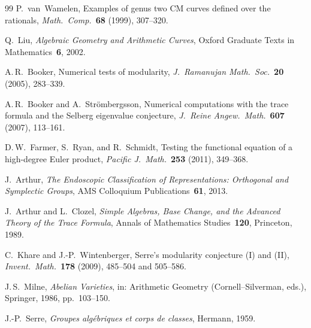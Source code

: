 \documentclass[11pt,a4paper]{article}
\theoremstyle{definition}
\theoremstyle{remark}
\begin{document}
\begin{thebibliography}{99}
P.~van~Wamelen,
Examples of genus two CM curves defined over the rationals,
\emph{Math.\ Comp.}~\textbf{68} (1999), 307--320.

Q.~Liu,
\emph{Algebraic Geometry and Arithmetic Curves},
Oxford Graduate Texts in Mathematics~\textbf{6}, 2002.

A.\,R.~Booker,
Numerical tests of modularity,
\emph{J.\ Ramanujan Math.\ Soc.}~\textbf{20} (2005), 283--339.

A.\,R.~Booker and A.~Str\"ombergsson,
Numerical computations with the trace formula and the Selberg
eigenvalue conjecture,
\emph{J.\ Reine Angew.\ Math.}~\textbf{607} (2007), 113--161.

D.\,W.~Farmer, S.~Ryan, and R.~Schmidt,
Testing the functional equation of a high-degree Euler product,
\emph{Pacific J.\ Math.}~\textbf{253} (2011), 349--368.

J.~Arthur,
\emph{The Endoscopic Classification of Representations: Orthogonal and
Symplectic Groups},
AMS Colloquium Publications~\textbf{61}, 2013.

J.~Arthur and L.~Clozel,
\emph{Simple Algebras, Base Change, and the Advanced Theory of the
Trace Formula},
Annals of Mathematics Studies~\textbf{120}, Princeton, 1989.

C.~Khare and J.-P.~Wintenberger,
Serre's modularity conjecture (I) and (II),
\emph{Invent.\ Math.}~\textbf{178} (2009), 485--504 and 505--586.

J.\,S.~Milne,
\emph{Abelian Varieties},
in: Arithmetic Geometry (Cornell--Silverman, eds.),
Springer, 1986, pp.~103--150.

J.-P.~Serre,
\emph{Groupes alg\'ebriques et corps de classes},
Hermann, 1959.

\end{thebibliography}
\end{document}
